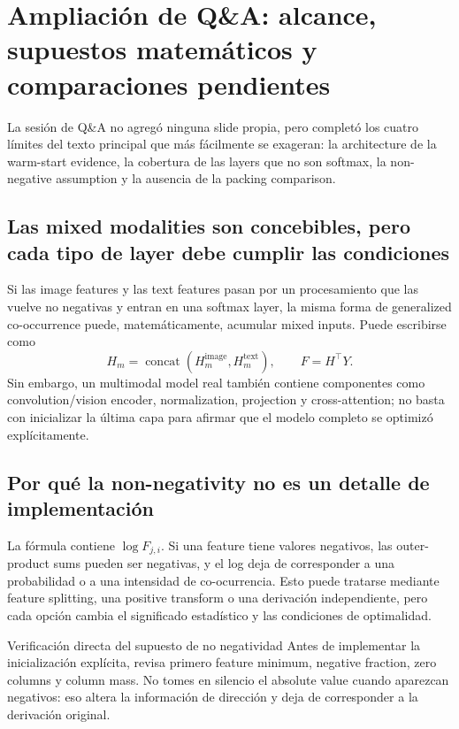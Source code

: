 \section{Ampliación de Q\&A: alcance, supuestos matemáticos y comparaciones pendientes}

La sesión de Q\&A no agregó ninguna slide propia, pero completó los cuatro límites del texto principal que más fácilmente se exageran: la architecture de la warm-start evidence, la cobertura de las layers que no son softmax, la non-negative assumption y la ausencia de la packing comparison.

\subsection{Las mixed modalities son concebibles, pero cada tipo de layer debe cumplir las condiciones}

Si las image features y las text features pasan por un procesamiento que las vuelve no negativas y entran en una softmax layer, la misma forma de generalized co-occurrence puede, matemáticamente, acumular mixed inputs. Puede escribirse como
\[
H_m=\operatorname{concat}(H_m^{\text{image}},H_m^{\text{text}}),
\qquad F=H^\top Y.
\]
Sin embargo, un multimodal model real también contiene componentes como convolution/vision encoder, normalization, projection y cross-attention; no basta con inicializar la última capa para afirmar que el modelo completo se optimizó explícitamente.


\subsection{Por qué la non-negativity no es un detalle de implementación}

La fórmula contiene $\log F_{j,i}$. Si una feature tiene valores negativos, las outer-product sums pueden ser negativas, y el log deja de corresponder a una probabilidad o a una intensidad de co-ocurrencia. Esto puede tratarse mediante feature splitting, una positive transform o una derivación independiente, pero cada opción cambia el significado estadístico y las condiciones de optimalidad.

\begin{importantbox}{Verificación directa del supuesto de no negatividad}
Antes de implementar la inicialización explícita, revisa primero feature minimum, negative fraction, zero columns y column mass. No tomes en silencio el absolute value cuando aparezcan negativos: eso altera la información de dirección y deja de corresponder a la derivación original.
\end{importantbox}


